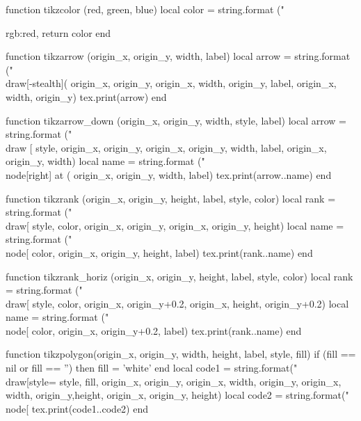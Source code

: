 \begin{luacode*}
  function tikzcolor (red, green, blue)
  local color = string.format ("{rgb:red,%
  return color
  end

  function tikzarrow (origin_x, origin_y, width, label)
  local arrow = string.format ("\\draw[-stealth](%
  origin_x, origin_y, origin_x, width, origin_y, label, origin_x, width, origin_y)
  tex.print(arrow)
  end

  function tikzarrow_down (origin_x, origin_y, width, style, label)
  local arrow = string.format ("\\draw [%
  style, origin_x, origin_y, origin_x, origin_y, width, label, origin_x, origin_y, width)
  local name = string.format ("\\node[right] at (%
  origin_x, origin_y, width, label)
  tex.print(arrow..name)
  end

  function tikzrank (origin_x, origin_y, height, label, style, color)
  local rank = string.format ("\\draw[%
  style, color, origin_x, origin_y, origin_x, origin_y, height)
  local name = string.format ("\\node[%
  color, origin_x, origin_y, height, label)
  tex.print(rank..name)
  end

  function tikzrank_horiz (origin_x, origin_y, height, label, style, color)
  local rank = string.format ("\\draw[%
  style, color, origin_x, origin_y+0.2, origin_x, height, origin_y+0.2)
  local name = string.format ("\\node[%
  color, origin_x, origin_y+0.2, label)
  tex.print(rank..name)
  end

  function tikzpolygon(origin_x, origin_y, width, height, label, style, fill)
  if (fill == nil or fill == '') then
    fill = 'white'
  end
  local code1 = string.format("\\draw[style=%
  style, fill, origin_x, origin_y, origin_x, width, origin_y, origin_x, width,
  origin_y,height, origin_x, origin_y, height)
  local code2 =
  string.format("\\node[%
  tex.print(code1..code2)
  end

}
\end{luacode*}
